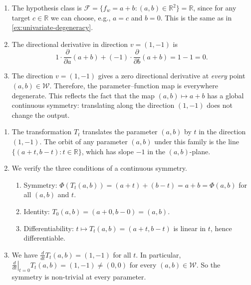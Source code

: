 \documentclass[11pt]{article}
\newcommand{\R}{\mathbb{R}}
\newcommand{\W}{\mathcal{W}}
\newcommand{\F}{\mathcal{F}}
\begin{document}
\begin{solution}
\begin{enumerate}
    \item The hypothesis class is $\F = \{f_w = a + b : (a, b) \in \R^2\} = \R$, since for any target $c \in \R$ we can choose, e.g., $a = c$ and $b = 0$. This is the same as in \cref{ex:univariate-degeneracy}.

    \item The directional derivative in direction $v = (1, -1)$ is
    \begin{equation*}
        1 \cdot \frac{\partial}{\partial a}(a + b) + (-1) \cdot \frac{\partial}{\partial b}(a + b) = 1 - 1 = 0.
    \end{equation*}

    \item The direction $v = (1, -1)$ gives a zero directional derivative at \emph{every} point $(a, b) \in \W$. Therefore, the parameter--function map is everywhere degenerate. This reflects the fact that the map $(a, b) \mapsto a + b$ has a global continuous symmetry: translating along the direction $(1, -1)$ does not change the output. \qedhere
\end{enumerate}
\end{solution}

\begin{solution}
\begin{enumerate}
    \item The transformation $T_t$ translates the parameter $(a, b)$ by $t$ in the direction $(1, -1)$. The orbit of any parameter $(a, b)$ under this family is the line $\{(a + t, b - t) : t \in \R\}$, which has slope $-1$ in the $(a, b)$-plane.

    \item We verify the three conditions of a continuous symmetry.
    \begin{enumerate}[label=(\roman*)]
        \item Symmetry: $\Phi(T_t(a, b)) = (a + t) + (b - t) = a + b = \Phi(a, b)$ for all $(a, b)$ and $t$.
        \item Identity: $T_0(a, b) = (a + 0, b - 0) = (a, b)$.
        \item Differentiability: $t \mapsto T_t(a, b) = (a + t, b - t)$ is linear in $t$, hence differentiable.
    \end{enumerate}

    \item We have $\frac{d}{dt} T_t(a, b) = (1, -1)$ for all $t$. In particular, $\left.\frac{d}{dt}\right|_{t=0} T_t(a, b) = (1, -1) \neq (0, 0)$ for every $(a, b) \in \W$. So the symmetry is non-trivial at every parameter. \qedhere
\end{enumerate}
\end{solution}
\end{document}
